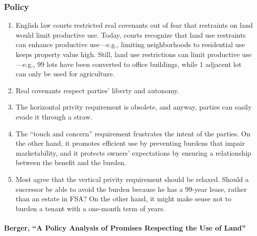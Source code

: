 \subsubsection{Policy}

\begin{enumerate}
    \item English law courts restricted real covenants out of fear that 
    restraints on land would limit productive use. Today, courts recognize 
    that land use restraints can enhance productive use---e.g., limiting 
    neighborhoods to residential use keeps property value high. Still, land 
    use restrictions can limit productive use---e.g., 99 lots have been 
    converted to office buildings, while 1 adjacent lot can only be used for 
    agriculture.
    \item Real covenants respect parties' liberty and autonomy.
    \item The horizontal privity requirement is obsolete, and anyway, parties 
    can easily evade it through a straw.
    \item The ``touch and concern'' requirement frustrates the intent of the 
    parties. On the other hand, it promotes efficient use by preventing 
    burdens that impair marketability, and it protects owners' expectations by 
    ensuring a relationship between the benefit and the burden.
    \item Most agree that the vertical privity requirement should be relaxed. 
    Should a successor be able to avoid the burden because he has a 99-year 
    lease, rather than an estate in FSA? On the other hand, it might make 
    sense not to burden a tenant with a one-month term of years.
\end{enumerate}

\paragraph{Berger, ``A Policy Analysis of Promises Respecting the Use of 
Land''}

